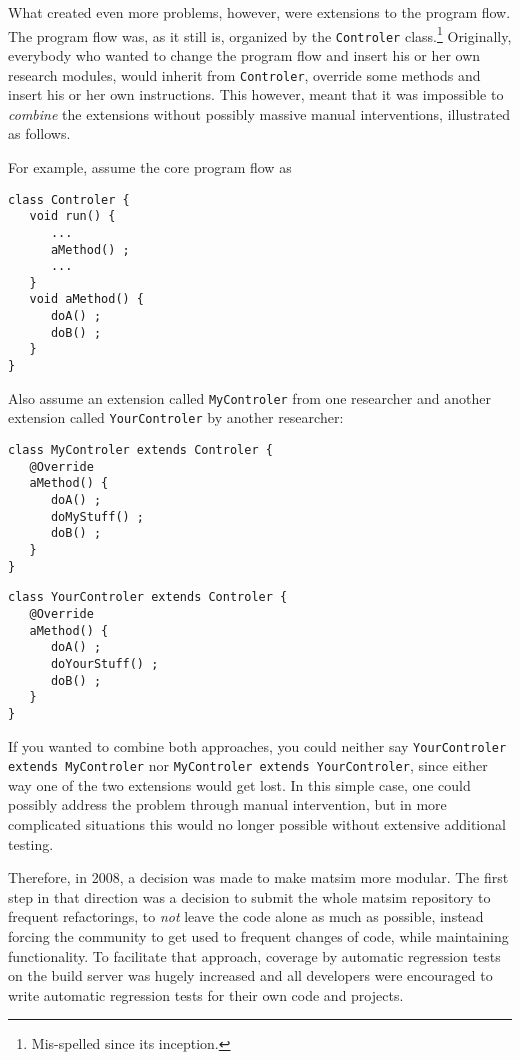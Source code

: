 What created even more problems, however, were extensions to the program flow.  The program flow was, as it still is, organized by the \lstinline$Controler$ class.\footnote{Mis-spelled since its inception.}  Originally, everybody who wanted to change the program flow and insert his or her own research \glspl{module}, would inherit from \lstinline$Controler$, override some methods and insert his or her own instructions.  This however, meant that it was impossible to \emph{combine} the \glspl{extension} without possibly massive manual interventions, illustrated as follows.

For example, assume the core program flow as
\begin{lstlisting}
class Controler {
   void run() {
      ...
      aMethod() ;
      ...
   }
   void aMethod() {
      doA() ;
      doB() ;
   }
}
\end{lstlisting}
Also assume an extension called \protect\lstinline$MyControler$
from one researcher and another extension called \protect\lstinline$YourControler$ by another researcher:
\begin{lstlisting}
class MyControler extends Controler {
   @Override
   aMethod() {
      doA() ;
      doMyStuff() ;
      doB() ;
   }
}
\end{lstlisting}
\begin{lstlisting}
class YourControler extends Controler {
   @Override
   aMethod() {
      doA() ;
      doYourStuff() ;
      doB() ;
   }
}  
\end{lstlisting}
%
If you wanted to combine both approaches, you could neither say \protect\lstinline$YourControler extends MyControler$ nor \protect\lstinline$MyControler extends YourControler$, since either way one of the two extensions would get lost.  In this simple case, one could possibly address the problem through manual intervention, but in more complicated situations this would no longer possible without extensive additional testing. %

Therefore, in 2008, a decision was made to make \gls{matsim} more modular.  The first step in that direction was a decision to submit the whole \gls{matsim} repository to frequent refactorings, \ie to \emph{not} leave the code alone as much as possible, instead forcing the community to get used to frequent changes of code, while maintaining functionality. To facilitate that approach, coverage by automatic regression tests on the build server was hugely increased and all developers were encouraged to write automatic regression tests for their own code and projects. 

